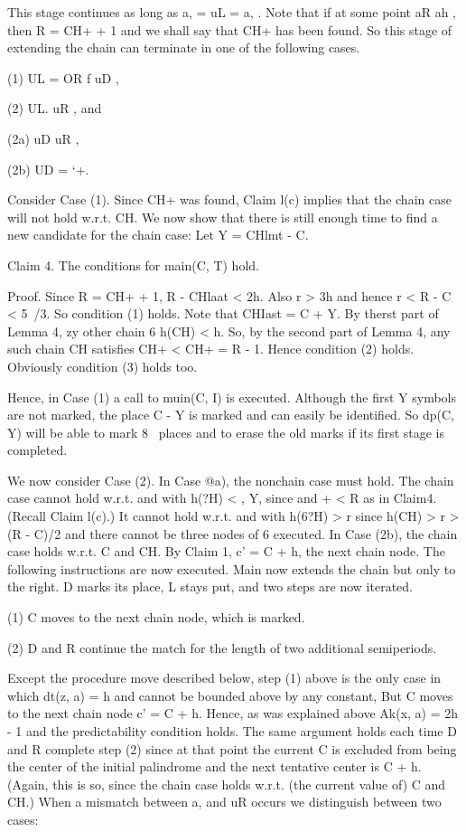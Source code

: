 \documentclass[11pt,a4paper]{report}
\begin{document}
This stage continues as long as a, = uL = a, . Note that if at some point aR ah ,
then R = CH+ + 1 and we shall say that CH+ has been found. So this stage of extending
the chain can terminate in one of the following cases.

(1) UL = OR f uD ,

(2) UL. uR , and
\begin{myindentpar}{3cm}
(2a) uD  uR ,

(2b) UD = ‘+.
\end{myindentpar}

Consider Case (1). Since CH+ was found, Claim l(c) implies that the chain case will
not hold w.r.t. CH. We now show that there is still enough time to find a new candidate
for the chain case: Let Y = CHlmt - C.

Claim 4. The conditions for main(C, T) hold.

Proof. Since R = CH+ + 1, R - CHlaat < 2h. Also r > 3h and hence r < R -
C < 5~/3. So condition (1) holds. Note that CHIast = C + Y. By therst part of Lemma
4, zy other chain 6%
h(CH) < h. So, by the second part of Lemma 4, any such chain CH satisfies CH+ <
CH+ = R - 1. Hence condition (2) holds. Obviously condition (3) holds too. 

Hence, in Case (1) a call to muin(C, I) is executed. Although the first Y symbols are
not marked, the place C - Y is marked and can easily be identified. So dp(C, Y) will be
able to mark 8~ places and to erase the old marks if its first stage is completed.

We now consider Case (2). In Case @a), the nonchain case must hold. The chain case
cannot hold w.r.t.  and with h(?H) < , Y, since  and + < R as in Claim4. (Recall Claim l(c).)
It cannot hold w.r.t.  and  with h(6?H) > r since h(CH) > r > (R - C)/2 and there
cannot be three nodes of 6%
executed. In Case (2b), the chain case holds w.r.t. C and CH. By Claim 1, c’ = C + h,
the next chain node. The following instructions are now executed.
Main now extends the chain but only to the right. D marks its place, L stays put, and
two steps are now iterated.

(1) C moves to the next chain node, which is marked.

(2) D and R continue the match for the length of two additional semiperiods.

Except the procedure move described below, step (1) above is the only case in which
dt(z, a) = h and cannot be bounded above by any constant, But C moves to the next
chain node c’ = C + h. Hence, as was explained above Ak(x, a) = 2h - 1 and the
predictability condition holds. The same argument holds each time D and R complete
step (2) since at that point the current C is excluded from being the center of the initial
palindrome and the next tentative center is C + h. (Again, this is so, since the chain case 
holds w.r.t. (the current value of) C and CH.) When a mismatch between a, and uR
occurs we distinguish between two cases:
\end{document}
